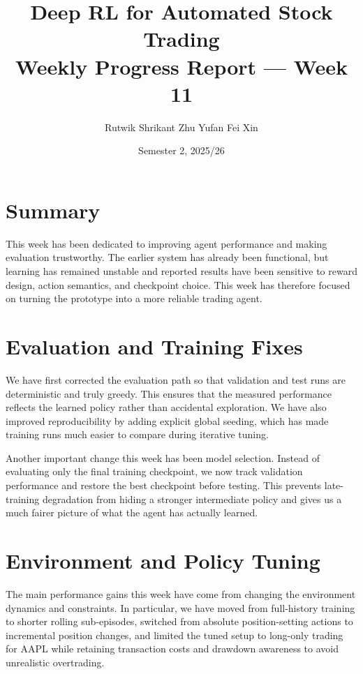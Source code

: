 \documentclass[11pt,twocolumn]{article}
\title{\textbf{Deep RL for Automated Stock Trading}\\[4pt]
\large Weekly Progress Report --- Week 11}
\author{
Rutwik Shrikant \quad
Zhu Yufan \quad
Fei Xin
}
\date{Semester 2, 2025/26}
\begin{document}
\maketitle

\section{Summary}

This week has been dedicated to improving agent performance and making evaluation trustworthy. The earlier system has already been functional, but learning has remained unstable and reported results have been sensitive to reward design, action semantics, and checkpoint choice. This week has therefore focused on turning the prototype into a more reliable trading agent.

\section{Evaluation and Training Fixes}

We have first corrected the evaluation path so that validation and test runs are deterministic and truly greedy. This ensures that the measured performance reflects the learned policy rather than accidental exploration. We have also improved reproducibility by adding explicit global seeding, which has made training runs much easier to compare during iterative tuning.

Another important change this week has been model selection. Instead of evaluating only the final training checkpoint, we now track validation performance and restore the best checkpoint before testing. This prevents late-training degradation from hiding a stronger intermediate policy and gives us a much fairer picture of what the agent has actually learned.

\section{Environment and Policy Tuning}

The main performance gains this week have come from changing the environment dynamics and constraints. In particular, we have moved from full-history training to shorter rolling sub-episodes, switched from absolute position-setting actions to incremental position changes, and limited the tuned setup to long-only trading for AAPL while retaining transaction costs and drawdown awareness to avoid unrealistic overtrading.
\end{document}
